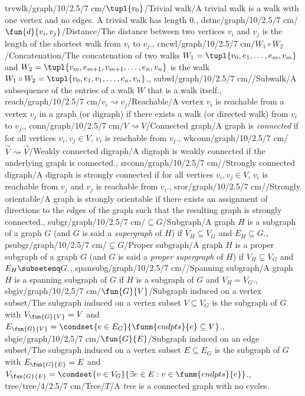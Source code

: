 trvwlk/graph/10/2.5/7 cm/{$\tupl{v_0}$}/{Trivial walk}/{A trivial walk is a walk with one vertex and no edges. A trivial walk has length $0$.},
dstnc/graph/10/2.5/7 cm/{$\fun{d}{v_i,v_j}$}/{Distance}/{The distance between two vertices $v_i$ and $v_j$ is the length of the shortest walk from $v_i$ to $v_j$.},
cncwl/graph/10/2.5/7 cm/{$W_1\circ W_2$}/{Concatenation}/{The concatenation of two walks $W_1=\tupl{v_0,e_1,\ldots,e_m,v_m}$ and $W_2=\tupl{v_m,e_{m+1},v_{m+1},\ldots,e_n,v_n}$ is the walk $W_1\circ W_2=\tupl{v_0,e_1,v_1,\ldots,e_n,v_n}$.},
subwl/graph/10/2.5/7 cm/{}/{Subwalk}/{A subsequence of the entries of a walk $W$ that is a walk itself.},
reach/graph/10/2.5/7 cm/{$v_i\rightsquigarrow v_j$}/{Reachable}/{A vertex $v_i$ is reachable from a vertex $v_j$ in a graph (or digraph) if there exists a walk (or directed walk) from $v_i$ to $v_j$.},
conn/graph/10/2.5/7 cm/{$V\rightsquigarrow V$}/{Connected graph}/{A graph is \emph{connected} if for all vertices $v_i,v_j\in V$, $v_i$ is reachable from $v_j$.},
wkconn/graph/10/2.5/7 cm/{$\vec{V}\rightsquigarrow\vec{V}$}/{Weakly connected digraph}/{A digraph is weakly connected if the underlying graph is connected.},
srconn/graph/10/2.5/7 cm/{}/{Strongly connected digraph}/{A digraph is strongly connected if for all vertices $v_i,v_j\in V$, $v_i$ is reachable from $v_j$ and $v_j$ is reachable from $v_i$.},
sror/graph/10/2.5/7 cm/{}/{Strongly orientable}/{A graph is strongly orientable if there exists an assignment of directions to the edges of the graph such that the resulting graph is strongly connected.},
subgr/graph/10/2.5/7 cm/{$\subseteq G$}/{Subgraph}/{A graph $H$ is a subgraph of a graph $G$ (and $G$ is said a \emph{supergraph} of $H$) if $V_H\subseteq V_G$ and $E_H\subseteq G$.},
psubgr/graph/10/2.5/7 cm/{$\subsetneq G$}/{Proper subgraph}/{A graph $H$ is a proper subgraph of a graph $G$ (and $G$ is said a \emph{proper supergraph} of $H$) if $V_H\subsetneq V_G$ and $E_H\subsetenq G$.},
spansubg/graph/10/2.5/7 cm/{}/{Spanning subgraph}/{A graph $H$ is a spanning subgraph of $G$ if $H$ is a subgraph of $G$ and $V_H=V_G$.},
sbgiv/graph/10/2.5/7 cm/{$\fun{G}{V}$}/{Subgraph induced on a vertex subset}/{The subgraph induced on a vertex subset $V\subseteq V_G$ is the subgraph of $G$ with $V_{\fun{G}{V}}=V$ and $E_{\fun{G}{V}}=\condset{e\in E_G}{\funm{endpts}{e}\subseteq V}$.},
sbgie/graph/10/2.5/7 cm/{$\fun{G}{E}$}/{Subgraph induced on an edge subset}/{The subgraph induced on a vertex subset $E\subseteq E_G$ is the subgraph of $G$ with $E_{\fun{G}{E}}=E$ and $V_{\fun{G}{E}}=\condset{v\in V_G}{\exists e\in E:v\in\funm{endpts}{e}}$.},
tree/tree/4/2.5/7 cm/Tree/$T$/{A \emph{tree} is a connected graph with no cycles.}